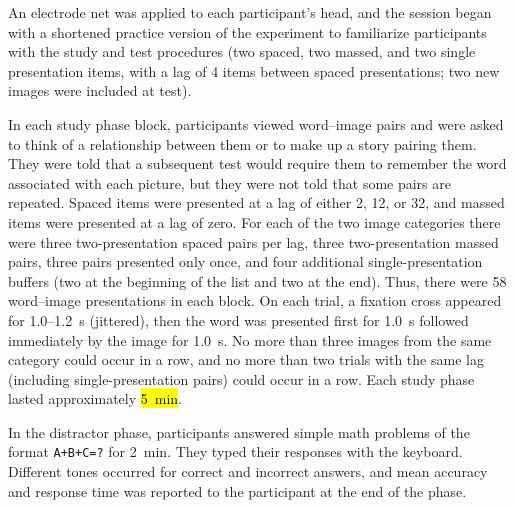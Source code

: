 An electrode net was applied to each participant's head, and the session began with a shortened practice version of the experiment to familiarize participants with the study and test procedures (two spaced, two massed, and two single presentation items, with a lag of 4 items between spaced presentations; two new images were included at test).




In each study phase block, participants viewed word--image pairs and were asked to think of a relationship between them or to make up a story pairing them.  They were told that a subsequent test would require them to remember the word associated with each picture, but they were not told that some pairs are repeated.  Spaced items were presented at a lag of either 2, 12, or 32, and massed items were presented at a lag of zero.  For each of the two image categories there were three two-presentation spaced pairs per lag, three two-presentation massed pairs, three pairs presented only once, and four additional single-presentation buffers (two at the beginning of the list and two at the end).
Thus, there were 58 word--image presentations in each block.  On each trial, a fixation cross appeared for 1.0--1.2~s (jittered), then the word was presented first for 1.0~s followed immediately by the image for 1.0~s.  No more than three images from the same category could occur in a row, and no more than two trials with the same lag (including single-presentation pairs) could occur in a row.  Each study phase lasted approximately \hl{5~min}.

In the distractor phase, participants answered simple math problems of the format \texttt{A+B+C=?} for 2~min.  They typed their responses with the keyboard.  Different tones occurred for correct and incorrect answers, and mean accuracy and response time was reported to the participant at the end of the phase.

